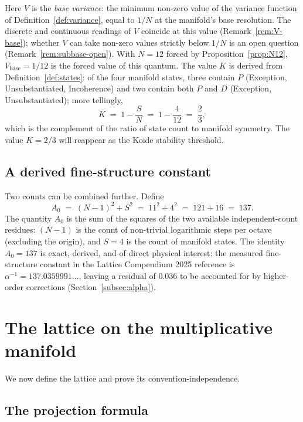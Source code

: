 \documentclass[11pt,a4paper]{article}
\theoremstyle{definition}
\theoremstyle{remark}
\begin{document}
Here $V$ is the \emph{base variance}: the minimum non-zero value of the variance function of Definition~\ref{def:variance}, equal to $1/N$ at the manifold's base resolution. The discrete and continuous readings of $V$ coincide at this value (Remark~\ref{rem:V-base}); whether $V$ can take non-zero values strictly below $1/N$ is an open question (Remark~\ref{rem:subbase-open}). With $N=12$ forced by Proposition~\ref{prop:N12}, $V_{\text{base}} = 1/12$ is the forced value of this quantum. The value $K$ is derived from Definition~\ref{def:states}: of the four manifold states, three contain $P$ (Exception, Unsubstantiated, Incoherence) and two contain both $P$ and $D$ (Exception, Unsubstantiated); more tellingly,
\[
K \;=\; 1 - \frac{S}{N} \;=\; 1 - \frac{4}{12} \;=\; \frac{2}{3},
\]
which is the complement of the ratio of state count to manifold symmetry. The value $K=2/3$ will reappear as the Koide stability threshold.

\subsection{A derived fine-structure constant}

Two counts can be combined further. Define
\begin{equation}\label{eq:A0}
A_{0} \;=\; (N-1)^{2} + S^{2} \;=\; 11^{2} + 4^{2} \;=\; 121 + 16 \;=\; 137.
\end{equation}
The quantity $A_{0}$ is the sum of the squares of the two available independent-count residues: $(N-1)$ is the count of non-trivial logarithmic steps per octave (excluding the origin), and $S=4$ is the count of manifold states. The identity $A_{0}=137$ is exact, derived, and of direct physical interest: the measured fine-structure constant in the Lattice Compendium 2025 reference is $\alpha^{-1}=137.0359991...$, leaving a residual of $0.036$ to be accounted for by higher-order corrections (Section~\ref{subsec:alpha}).

\section{The lattice on the multiplicative manifold}\label{sec:lattice}

We now define the lattice and prove its convention-independence.

\subsection{The projection formula}
\end{document}
